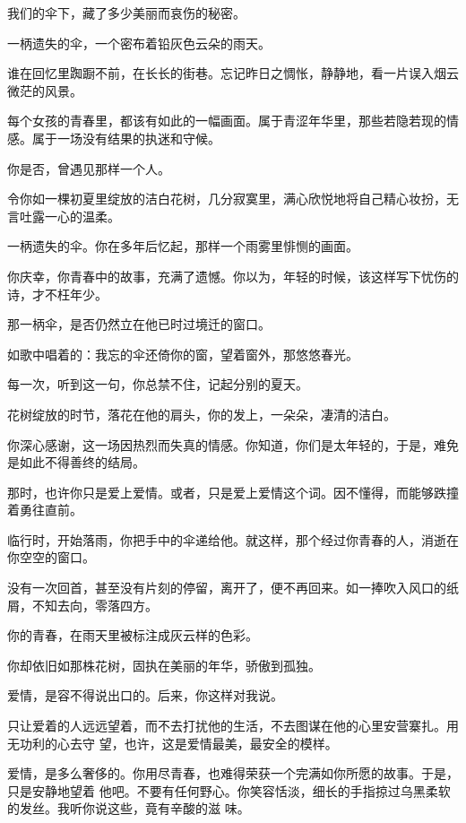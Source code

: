 	\endwriting



		我们的伞下，藏了多少美丽而哀伤的秘密。


		\vspace{1em}
		一柄遗失的伞，一个密布着铅灰色云朵的雨天。\par
		谁在回忆里踟蹰不前，在长长的街巷。忘记昨日之惆怅，静静地，看一片误入烟云微茫的风景。\par
		每个女孩的青春里，都该有如此的一幅画面。属于青涩年华里，那些若隐若现的情感。属于一场没有结果的执迷和守候。\par
		你是否，曾遇见那样一个人。\par
		令你如一棵初夏里绽放的洁白花树，几分寂寞里，满心欣悦地将自己精心妆扮，无言吐露一心的温柔。\par
		一柄遗失的伞。你在多年后忆起，那样一个雨雾里悱恻的画面。\par
		你庆幸，你青春中的故事，充满了遗憾。你以为，年轻的时候，该这样写下忧伤的诗，才不枉年少。\par
		那一柄伞，是否仍然立在他已时过境迁的窗口。\par
		如歌中唱着的：我忘的伞还倚你的窗，望着窗外，那悠悠春光。\par
		每一次，听到这一句，你总禁不住，记起分别的夏天。\par
		花树绽放的时节，落花在他的肩头，你的发上，一朵朵，凄清的洁白。\par
		你深心感谢，这一场因热烈而失真的情感。你知道，你们是太年轻的，于是，难免是如此不得善终的结局。

		那时，也许你只是爱上爱情。或者，只是爱上爱情这个词。因不懂得，而能够跌撞着勇往直前。

		临行时，开始落雨，你把手中的伞递给他。就这样，那个经过你青春的人，消逝在你空空的窗口。\par
		没有一次回首，甚至没有片刻的停留，离开了，便不再回来。如一捧吹入风口的纸屑，不知去向，零落四方。

		你的青春，在雨天里被标注成灰云样的色彩。\par
		你却依旧如那株花树，固执在美丽的年华，骄傲到孤独。

		爱情，是容不得说出口的。后来，你这样对我说。

		只让爱着的人远远望着，而不去打扰他的生活，不去图谋在他的心里安营寨扎。用无功利的心去守
	望，也许，这是爱情最美，最安全的模样。

		爱情，是多么奢侈的。你用尽青春，也难得荣获一个完满如你所愿的故事。于是，只是安静地望着
	他吧。不要有任何野心。你笑容恬淡，细长的手指掠过乌黑柔软的发丝。我听你说这些，竟有辛酸的滋
	味。

